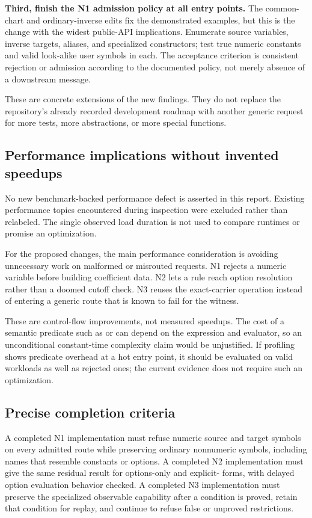 \documentclass[11pt,letterpaper]{article}
\newcommand{\code}[1]{\texttt{\detokenize{#1}}}
\begin{document}
\textbf{Third, finish the N1 admission policy at all entry points.} The common-chart and ordinary-inverse edits fix the demonstrated examples, but this is the change with the widest public-API implications. Enumerate source variables, inverse targets, aliases, and specialized constructors; test true numeric constants and valid look-alike user symbols in each. The acceptance criterion is consistent rejection or admission according to the documented policy, not merely absence of a downstream message.

These are concrete extensions of the new findings. They do not replace the repository's already recorded development roadmap with another generic request for more tests, more abstractions, or more special functions.

\subsection{Performance implications without invented speedups}

No new benchmark-backed performance defect is asserted in this report. Existing performance topics encountered during inspection were excluded rather than relabeled. The single observed load duration is not used to compare runtimes or promise an optimization.

For the proposed changes, the main performance consideration is avoiding unnecessary work on malformed or misrouted requests. N1 rejects a numeric variable before building coefficient data. N2 lets a rule reach option resolution rather than a doomed cutoff check. N3 reuses the exact-carrier operation instead of entering a generic route that is known to fail for the witness.

These are control-flow improvements, not measured speedups. The cost of a semantic predicate such as \code{NumericQ} or \code{exactRealQ} can depend on the expression and evaluator, so an unconditional constant-time complexity claim would be unjustified. If profiling shows predicate overhead at a hot entry point, it should be evaluated on valid workloads as well as rejected ones; the current evidence does not require such an optimization.

\subsection{Precise completion criteria}

A completed N1 implementation must refuse numeric source and target symbols on every admitted route while preserving ordinary nonnumeric symbols, including names that resemble constants or options. A completed N2 implementation must give the same residual result for options-only and explicit-\code{Automatic} forms, with delayed option evaluation behavior checked. A completed N3 implementation must preserve the specialized observable capability after a condition is proved, retain that condition for replay, and continue to refuse false or unproved restrictions.
\end{document}
